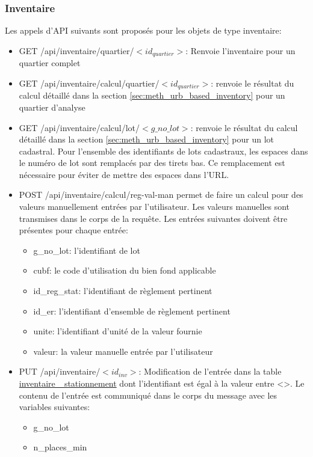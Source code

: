 \subsubsection{Inventaire} 
Les appels d'API suivants sont proposés pour les objets de type inventaire:
\begin{itemize}
    \item GET /api/inventaire/quartier/$<id_{quartier}>$: Renvoie l'inventaire pour un quartier complet
    \item GET /api/inventaire/calcul/quartier/$<id_{quartier}>$: renvoie le résultat du calcul détaillé dans la section \ref{sec:meth_urb_based_inventory} pour un quartier d'analyse
    \item GET /api/inventaire/calcul/lot/$<g\_no\_lot>$: renvoie le résultat du calcul détaillé dans la section \ref{sec:meth_urb_based_inventory} pour un lot cadastral. Pour l'ensemble des identifiants de lots cadastraux, les espaces dans le numéro de lot sont remplacés par des tirets bas. Ce remplacement est nécessaire pour éviter de mettre des espaces dans l'\ac{URL}.
    \item POST /api/inventaire/calcul/reg-val-man permet de faire un calcul pour des valeurs manuellement entrées par l'utilisateur. Les valeurs manuelles sont transmises dans le corps de la requête. Les entrées suivantes doivent être présentes pour chaque entrée:
    \begin{itemize}
        \item g\_no\_lot: l'identifiant de lot
        \item cubf: le code d'utilisation du bien fond applicable
        \item id\_reg\_stat: l'identifiant de règlement pertinent
        \item id\_er: l'identifiant d'ensemble de règlement pertinent
        \item unite: l'identifiant d'unité de la valeur fournie
        \item valeur: la valeur manuelle entrée par l'utilisateur
    \end{itemize}
    \item PUT /api/inventaire/$<id_{inv}>$: Modification de l'entrée dans la table \ul{inventaire\_ stationnement} dont l'identifiant est égal à la valeur entre <>. Le contenu de l'entrée est communiqué dans le corps du message avec les variables suivantes:
    \begin{itemize}
        \item g\_no\_lot
        \item n\_places\_min

\end{itemize}
\end{itemize}
